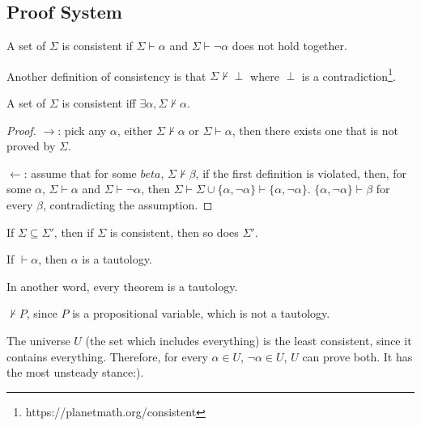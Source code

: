\subsection{Proof System}


\begin{definition}[consistent]
  A set of \wff $\Sigma$ is consistent if $\Sigma\vdash\alpha$ and $\Sigma\vdash\neg\alpha$ does not hold together.
\end{definition}

\begin{mdframed}
Another definition of consistency is that $\Sigma\nvdash\perp$ where $\perp$ is a contradiction\footnote{https://planetmath.org/consistent}.
\end{mdframed}

\begin{claim}
  A set of \wff $\Sigma$ is consistent iff $\exists\alpha, \Sigma\nvdash\alpha$.
\end{claim}

\begin{proof}

  $\rightarrow$: pick any $\alpha$, either $\Sigma\nvdash\alpha$ or $\Sigma\vdash\alpha$, then there exists one that is not proved by $\Sigma$.

$\leftarrow$: assume that for some $beta$, $\Sigma\nvdash\beta$, if the first definition is violated, then, for some $\alpha$, $\Sigma\vdash\alpha$ and $\Sigma\vdash\neg\alpha$, then $\Sigma\vdash\Sigma\cup\{\alpha,\neg\alpha\}\vdash\{\alpha,\neg\alpha\}$. $\{\alpha, \neg\alpha\}\vdash\beta$ for every $\beta$, contradicting the assumption.
\end{proof}

\begin{corollary}
If $\Sigma\subseteq\Sigma'$, then if $\Sigma$ is consistent, then so does $\Sigma'$.
\end{corollary}

\begin{definition}[Soundness]
If $\vdash\alpha$, then $\alpha$ is a tautology.
\begin{mdframed}
In another word, every theorem is a tautology.
\end{mdframed}
\end{definition}

\begin{corollary}
$\nvdash P$, since $P$ is a propositional variable, which is not a tautology.
\end{corollary}

The universe $U$ (the set which includes everything) is the least consistent, since it contains everything. Therefore, for every $\alpha\in U$, $\neg\alpha\in U$, $U$ can prove both. It has the most unsteady stance:).

